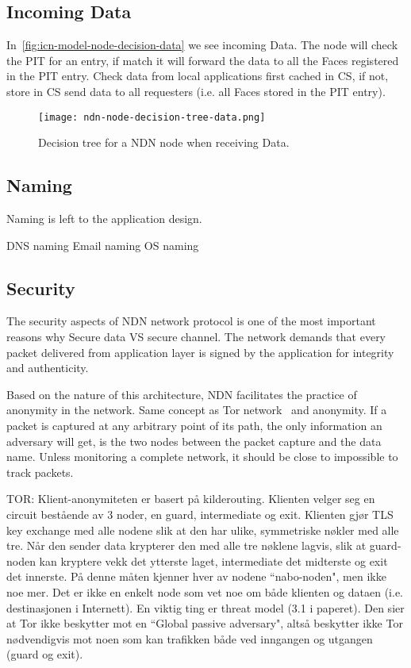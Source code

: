 \subsection{Incoming Data}
In~\autoref{fig:icn-model-node-decision-data} we see incoming Data.
The node will check  the \gls{PIT} for an entry, if match it will forward the data to all the Faces registered in the \gls{PIT} entry.
Check data from local applications first cached in \gls{CS}, if not, store in \gls{CS} send data to all requesters (i.e. all Faces stored in the \gls{PIT} entry).
\begin{figure}[H]
  \centering
  \texttt{[image: ndn-node-decision-tree-data.png]}
  \caption{Decision tree for a \gls{NDN} node when receiving Data.}
  \label{fig:icn-model-node-decision-data}
\end{figure}

\subsection{Naming}\label{naming}
Naming is left to the application design.

\gls{DNS} naming
Email naming
\gls{OS} naming

\subsection{Security}
The security aspects of \gls{NDN} network protocol is one of the most important reasons why 
Secure data VS secure channel.
The network demands that every packet delivered from application layer is signed by the application for integrity and authenticity.

Based on the nature of this architecture, \gls{NDN} facilitates the practice of anonymity in the network. 
Same concept as Tor network~\cite{DBLP:conf/uss/DingledineMS04} and anonymity.
If a packet is captured at any arbitrary point of its path, the only information an adversary will get, is the two nodes between the packet capture and the data name. Unless monitoring a complete network, it should be close to impossible to track packets.  

TOR:
Klient-anonymiteten er basert på kilderouting. Klienten velger seg en circuit bestående av 3 noder, en guard, intermediate og exit. Klienten gjør TLS key exchange med alle nodene slik at den har ulike, symmetriske nøkler med alle tre. Når den sender data krypterer den med alle tre nøklene lagvis, slik at guard-noden kan kryptere vekk det ytterste laget, intermediate det midterste og exit det innerste. På denne måten kjenner hver av nodene ``nabo-noden", men ikke noe mer. Det er ikke en enkelt node som vet noe om både klienten og dataen (i.e. destinasjonen i Internett). En viktig ting er threat model (3.1 i paperet). Den sier at Tor ikke beskytter mot en ``Global passive adversary", altså beskytter ikke Tor nødvendigvis mot noen som kan trafikken både ved inngangen og utgangen (guard og exit).

